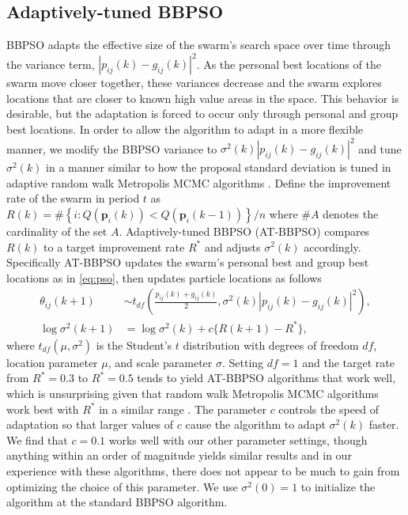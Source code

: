 \documentclass[cmbright]{staauth}
\begin{document}
\subsection{Adaptively-tuned BBPSO}\label{subsec:ATBBPSO}
BBPSO adapts the effective size of the swarm's search space over time through the variance term, $|p_{ij}(k) - g_{ij}(k)|^2$. As the personal best locations of the swarm move closer together, these variances decrease and the swarm explores locations that are closer to known high value areas in the space. This behavior is desirable, but the adaptation is forced to occur only through personal and group best locations. In order to allow the algorithm to adapt in a more flexible manner, we modify the BBPSO variance to $\sigma^2(k)|p_{ij}(k) - g_{ij}(k)|^2$ and tune $\sigma^2(k)$ in a manner similar to how the proposal standard deviation is tuned in adaptive random walk Metropolis MCMC algorithms \citep{andrieu2008tutorial}. Define the improvement rate of the swarm in period $t$ as $R(k) = \#\left\{i:Q(\bm{p}_i(k)) < Q(\bm{p}_i(k-1))\right\}/n$ where $\#A$ denotes the cardinality of the set $A$. Adaptively-tuned BBPSO (AT-BBPSO) compares $R(k)$ to a target improvement rate $R^*$ and adjusts $\sigma^2(k)$ accordingly. Specifically AT-BBPSO updates the swarm's personal best and group best locations as in \eqref{eq:pso}, then updates particle locations as follows
\begin{align}\label{eq:at-bbpso}
\theta_{ij}(k+1) &\sim t_{df}\left(\frac{p_{ij}(k) + g_{ij}(k)}{2}, \sigma^2(k)|p_{ij}(k) - g_{ij}(k)|^2\right),\nonumber\\
\log \sigma^2(k+1) &= \log\sigma^2(k) + c\{R(k+1) - R^*\},
\end{align}
where $t_{df}(\mu, \sigma^2)$ is the Student's $t$ distribution with degrees of freedom $df$, location parameter $\mu$, and scale parameter $\sigma$. Setting $df=1$ and the target rate from $R^*=0.3$ to $R^*=0.5$ tends to yield AT-BBPSO algorithms that work well, which is unsurprising given that random walk Metropolis MCMC algorithms work best with $R^*$ in a similar range \citep{gelman1996efficient}. The parameter $c$ controls the speed of adaptation so that larger values of $c$ cause the algorithm to adapt $\sigma^2(k)$ faster. We find that $c=0.1$ works well with our other parameter settings, though anything within an order of magnitude yields similar results and in our experience with these algorithms, there does not appear to be much to gain from optimizing the choice of this parameter. We use $\sigma^2(0)=1$ to initialize the algorithm at the standard BBPSO algorithm. 
\end{document}
